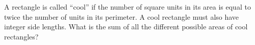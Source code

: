A rectangle is called ``cool'' if the number of square units in its area is equal to twice the number of units in its perimeter. A cool rectangle must also have integer side lengths. What is the sum of all the different possible areas of cool rectangles?
